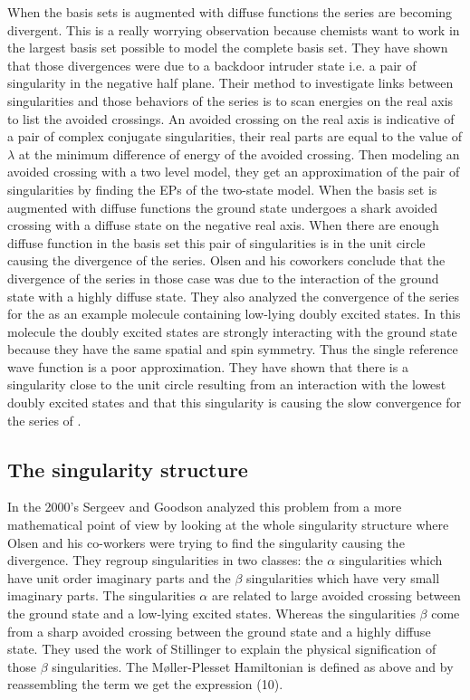 \documentclass[11pt,a4paper]{article}
\begin{document}
When the basis sets is augmented with diffuse functions the series are becoming divergent. This is a really worrying observation because chemists want to work in the largest basis set possible to model the complete basis set. They have shown that those divergences were due to a backdoor intruder state i.e. a pair of singularity in the negative half plane. Their method to investigate links between singularities and those behaviors of the series is to scan energies on the real axis to list the avoided crossings. An avoided crossing on the real axis is indicative of a pair of complex conjugate singularities, their real parts are equal to the value of $\lambda$ at the minimum difference of energy of the avoided crossing. Then modeling an avoided crossing with a two level model, they get an approximation of the pair of singularities by finding the EPs of the two-state model. When the basis set is augmented with diffuse functions the ground state undergoes a shark avoided crossing with a diffuse state on the negative real axis. When there are enough diffuse function in the basis set this pair of singularities is in the unit circle causing the divergence of the series. Olsen and his coworkers conclude that the divergence of the series in those case was due to the interaction of the ground state with a highly diffuse state. 
They also analyzed the convergence of the series for the  as an example molecule containing low-lying doubly excited states. In this molecule the doubly excited states are strongly interacting with the ground state because they have the same spatial and spin symmetry. Thus the single reference wave function is a poor approximation. They have shown that there is a singularity close to the unit circle resulting from an interaction with the lowest doubly excited states and that this singularity is causing the slow convergence for the series of .

\subsection{The singularity structure}

In the 2000's Sergeev and Goodson analyzed this problem from a more mathematical point of view by looking at the whole singularity structure where Olsen and his co-workers were trying to find the singularity causing the divergence. They regroup singularities in two classes: the $\alpha$ singularities which have unit order imaginary parts and the $\beta$ singularities which have very small imaginary parts. The singularities $\alpha$ are related to large avoided crossing between the ground state and a low-lying excited states. Whereas the singularities $\beta$ come from a sharp avoided crossing between the ground state and a highly diffuse state. They used the work of Stillinger to explain the physical signification of those $\beta$ singularities. 
The M{\o}ller-Plesset Hamiltonian is defined as above and by reassembling the term we get the expression (10).
\end{document}
